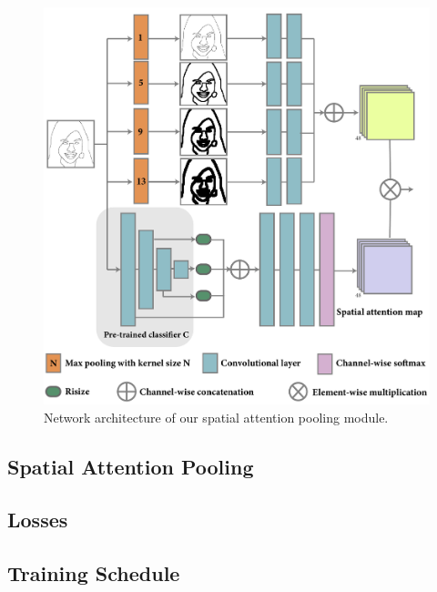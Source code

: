 \begin{figure}
	\includegraphics[width=\columnwidth]{figs/sap}
	\caption{Network architecture of our spatial attention pooling module.}
	\label{fig:sap}
\end{figure}


\subsection{Spatial Attention Pooling}
\label{subsec:algorithm_sap}




\subsection{Losses}
\label{subsec:algorithm_loss}


\subsection{Training Schedule}
\label{subsec:algorithm_training}

